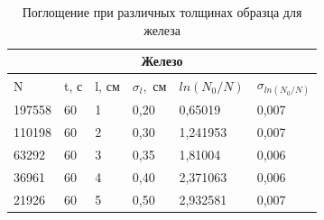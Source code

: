 \documentclass[a4paper,12pt]{article} %
\begin{document}
\begin{table}[h!]
\begin{center}
\begin{tabular}{|llllll|}
\hline
\multicolumn{6}{|c|}{Железо}                                                                                                                                                          \\ \hline
\multicolumn{1}{|l|}{N}      & \multicolumn{1}{l|}{t, с} & \multicolumn{1}{l|}{l, см} & \multicolumn{1}{l|}{$\sigma_l,$ см} & \multicolumn{1}{l|}{$ln(N_0/N)$} & $\sigma_{ln(N_0/N)}$ \\ \hline
\multicolumn{1}{|l|}{197558} & \multicolumn{1}{l|}{60}   & \multicolumn{1}{l|}{1}     & \multicolumn{1}{l|}{0,20}           & \multicolumn{1}{l|}{0,65019}     & 0,007                \\ \hline
\multicolumn{1}{|l|}{110198} & \multicolumn{1}{l|}{60}   & \multicolumn{1}{l|}{2}     & \multicolumn{1}{l|}{0,30}           & \multicolumn{1}{l|}{1,241953}    & 0,007                \\ \hline
\multicolumn{1}{|l|}{63292}  & \multicolumn{1}{l|}{60}   & \multicolumn{1}{l|}{3}     & \multicolumn{1}{l|}{0,35}           & \multicolumn{1}{l|}{1,81004}     & 0,006                \\ \hline
\multicolumn{1}{|l|}{36961}  & \multicolumn{1}{l|}{60}   & \multicolumn{1}{l|}{4}     & \multicolumn{1}{l|}{0,40}           & \multicolumn{1}{l|}{2,371063}    & 0,006                \\ \hline
\multicolumn{1}{|l|}{21926}  & \multicolumn{1}{l|}{60}   & \multicolumn{1}{l|}{5}     & \multicolumn{1}{l|}{0,50}           & \multicolumn{1}{l|}{2,932581}    & 0,007                \\ \hline
\end{tabular}

\end{center}

\caption{Поглощение при различных толщинах образца для железа}
\end{table}
\end{document}
